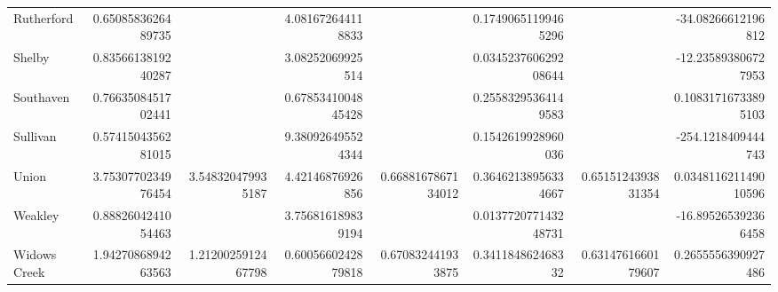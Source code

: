 \begin{tabular}{lrrrrrrr}
Rutherford & 0.6508583626489735 &  & 4.081672644118833 &  & 0.17490651199465296 &  & -34.08266612196812 \\
Shelby & 0.8356613819240287 &  & 3.08252069925514 &  & 0.034523760629208644 &  & -12.235893806727953 \\
Southaven & 0.7663508451702441 &  & 0.6785341004845428 &  & 0.25583295364149583 &  & 0.10831716733895103 \\
Sullivan & 0.5741504356281015 &  & 9.380926495524344 &  & 0.1542619928960036 &  & -254.1218409444743 \\
Union & 3.7530770234976454 & 3.548320479935187 & 4.42146876926856 & 0.6688167867134012 & 0.36462138956334667 & 0.6515124393831354 & 0.034811621149010596 \\
Weakley & 0.8882604241054463 &  & 3.756816189839194 &  & 0.013772077143248731 &  & -16.895265392366458 \\
Widows Creek & 1.9427086894263563 & 1.2120025912467798 & 0.6005660242879818 & 0.670832441933875 & 0.341184862468332 & 0.6314761660179607 & 0.2655556390927486 \\
\bottomrule
\end{tabular}
